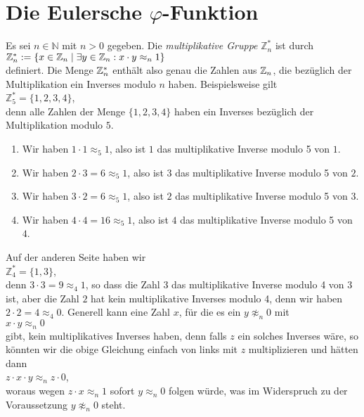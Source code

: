 \section{Die Eulersche $\varphi$-Funktion}
Es sei $n \in \mathbb{N}$ mit $n > 0$ gegeben.  Die \emph{multiplikative Gruppe} $\mathbb{Z}_n^*$
ist durch
\\[0.2cm]
\hspace*{1.3cm}
$\mathbb{Z}_{n}^* := \{ x \in \mathbb{Z}_{n} \mid \exists y \in \mathbb{Z}_{n} : x \cdot y \approx_n 1 \}$
\\[0.2cm]
definiert.  Die Menge $\mathbb{Z}_{n}^*$ enth\"{a}lt also genau die Zahlen aus $\mathbb{Z}_{n}$, die
bez\"{u}glich der Multiplikation ein Inverses modulo $n$ haben.  Beispielsweise gilt
\\[0.2cm]
\hspace*{1.3cm}
$\mathbb{Z}_5^* = \{ 1, 2, 3, 4 \}$,
\\[0.2cm]
denn alle Zahlen der Menge $\{ 1, 2, 3, 4 \}$ haben ein Inverses bez\"{u}glich der Multiplikation modulo
$5$.
\begin{enumerate}
\item Wir haben $1 \cdot 1 \approx_5 1$, also ist $1$ das multiplikative Inverse modulo 5 von $1$.
\item Wir haben $2 \cdot 3 = 6 \approx_5 1$, also ist $3$ das multiplikative Inverse modulo 5 von $2$.
\item Wir haben $3 \cdot 2 = 6 \approx_5 1$, also ist $2$ das multiplikative Inverse modulo 5 von $3$.
\item Wir haben $4 \cdot 4 = 16 \approx_5 1$, also ist $4$ das multiplikative Inverse modulo 5 von $4$.
\end{enumerate}
Auf der anderen Seite haben wir
\\[0.2cm]
\hspace*{1.3cm}
$\mathbb{Z}_4^* = \{ 1, 3 \}$,
\\[0.2cm]
denn $3 \cdot 3 = 9 \approx_4 1$, so dass die Zahl $3$ das multiplikative Inverse modulo 4 von $3$
ist, aber die Zahl $2$ hat kein multiplikative Inverses modulo 4, denn wir haben $2 \cdot 2 = 4 \approx_4 0$.
Generell kann eine Zahl $x$, f\"{u}r die es ein $y \not\approx_n 0$ mit
\\[0.2cm]
\hspace*{1.3cm}
$x \cdot y \approx_n 0$ 
\\[0.2cm]
gibt, kein multiplikatives Inverses haben, denn falls $z$ ein solches Inverses w\"{a}re, so k\"{o}nnten wir
die obige Gleichung einfach von links mit $z$ multiplizieren und h\"{a}tten dann
\\[0.2cm]
\hspace*{1.3cm}
$z \cdot x \cdot y \approx_n z \cdot 0$,
\\[0.2cm]
woraus wegen $z \cdot x \approx_n 1$ sofort $y \approx_n 0$ folgen w\"{u}rde, was im Widerspruch zu der
Voraussetzung $y \not\approx_n 0$ steht.

